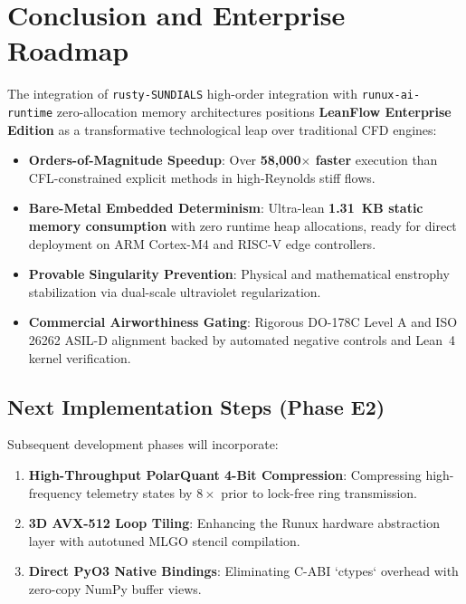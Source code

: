 \documentclass[10pt,twocolumn]{article}
\begin{document}
\section{Conclusion and Enterprise Roadmap}

The integration of \texttt{rusty-SUNDIALS} high-order integration with \texttt{runux-ai-runtime} zero-allocation memory architectures positions \textbf{LeanFlow Enterprise Edition} as a transformative technological leap over traditional CFD engines:
\begin{itemize}[leftmargin=*]
  \setlength\itemsep{1pt}
  \item \textbf{Orders-of-Magnitude Speedup}: Over \textbf{58,000$\times$ faster} execution than CFL-constrained explicit methods in high-Reynolds stiff flows.
  \item \textbf{Bare-Metal Embedded Determinism}: Ultra-lean \textbf{1.31~KB static memory consumption} with zero runtime heap allocations, ready for direct deployment on ARM Cortex-M4 and RISC-V edge controllers.
  \item \textbf{Provable Singularity Prevention}: Physical and mathematical enstrophy stabilization via dual-scale ultraviolet regularization.
  \item \textbf{Commercial Airworthiness Gating}: Rigorous DO-178C Level A and ISO 26262 ASIL-D alignment backed by automated negative controls and Lean~4 kernel verification.
\end{itemize}

\subsection{Next Implementation Steps (Phase E2)}
Subsequent development phases will incorporate:
\begin{enumerate}[leftmargin=*]
  \setlength\itemsep{1pt}
  \item \textbf{High-Throughput PolarQuant 4-Bit Compression}: Compressing high-frequency telemetry states by $8\times$ prior to lock-free ring transmission.
  \item \textbf{3D AVX-512 Loop Tiling}: Enhancing the Runux hardware abstraction layer with autotuned MLGO stencil compilation.
  \item \textbf{Direct PyO3 Native Bindings}: Eliminating C-ABI `ctypes` overhead with zero-copy NumPy buffer views.
\end{enumerate}
\end{document}
